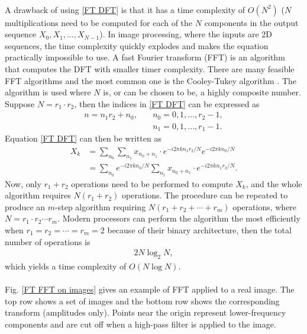 \documentclass[12pt, twocolumn]{report}
\begin{document}
\paragraph{}
A drawback of using \eqref{FT DFT} is that it has a time complexity of $O(N^2)$ ($N$ multiplications need to be computed for each of the $N$ components in the output sequence $X_0,X_1,...,X_{N-1}$). In image processing, where the inputs are 2D sequences, the time complexity quickly explodes and makes the equation practically impossible to use. A fast Fourier transform (FFT) is an algorithm that computes the DFT with smaller timer complexity. There are many feasible FFT algorithms and the most common one is the Cooley-Tukey algorithm \cite{FT FFT}. The algorithm is used where $N$ is, or can be chosen to be, a highly composite number. Suppose $N = r_1 \cdot r_2$, then the indices in \eqref{FT DFT} can be expressed as
\begin{align*}
    n = n_1r_2 + n_0, \quad & n_0 = 0, 1, ..., r_2 - 1, \\
    & n_1 = 0, 1, ..., r_1 - 1.
\end{align*}
Equation \eqref{FT DFT} can then be written as
\begin{align*}
    X_k & = \sum_{n_0}\sum_{n_1} x_{n_0 + n_1} \cdot e^{-i2\pi kn_1r_2/N} e^{-i2\pi kn_0/N} \\
    & = \sum_{n_0} e^{-i2\pi kn_0/N} \sum_{n_1} x_{n_0 + n_1} \cdot e^{-i2\pi kn_1r_2/N}.
\end{align*}
Now, only $r_1 + r_2$ operations need to be performed to compute $X_k$, and the whole algorithm requires $N(r_1 + r_2)$ operations. The procedure can be repeated to produce an $m$-step algorithm requiring $N(r_1 + r_2 + \cdots + r_m)$ operations, where $N = r_1 \cdot r_2 \cdots r_m$. Modern processors can perform the algorithm the most efficiently when $r_1 = r_2 = \cdots = r_m = 2$ because of their binary architecture, then the total number of operations is
\begin{align*}
    2N\log_2 N,
\end{align*}
which yields a time complexity of $O(N\log N)$. 

\paragraph{}
Fig. \ref{FT FFT on images} gives an example of FFT applied to a real image. The top row shows a set of images and the bottom row shows the corresponding transform (amplitudes only). Points near the origin represent lower-frequency components and are cut off when a high-pass filter is applied to the image.
\end{document}
